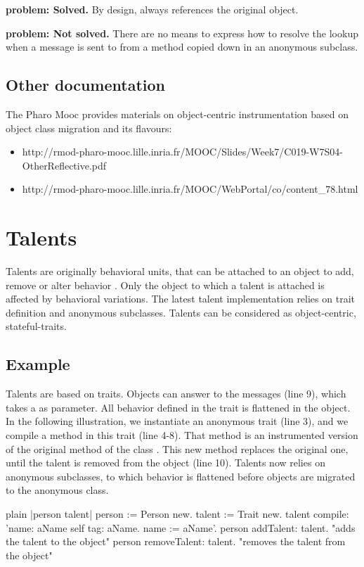 \documentclass[10pt,twoside,english]{_support/latex/sbabook/sbabook}
\begin{document}
\textbf{ problem: Solved.} By design,  always references the original object.

\textbf{ problem: Not solved.} There are no means to express how to resolve the lookup when a message is sent to  from a method copied down in an anonymous subclass.
\section{Other documentation}
The Pharo Mooc provides materials on object-centric instrumentation based on object class migration and its flavours:

\begin{itemize}
\item http://rmod-pharo-mooc.lille.inria.fr/MOOC/Slides/Week7/C019-W7S04-OtherReflective.pdf
\item http://rmod-pharo-mooc.lille.inria.fr/MOOC/WebPortal/co/content\_78.html
\end{itemize}
\chapter{Talents}
Talents are originally behavioral units, that can be attached to an object to add, remove or alter behavior \cite{ressia2014talents}. Only the object to which a talent is attached is affected by behavioral variations. The latest talent implementation relies on trait definition and anonymous subclasses. Talents can be considered as object-centric, stateful-traits.
\section{Example}
Talents are based on traits. Objects can answer to the  messages (line 9), which takes a  as parameter. All behavior defined in the trait is flattened in the object. In the following illustration, we instantiate an anonymous trait (line 3), and we compile a method in this trait (line 4-8). That method is an instrumented version of the original  method of the class . This new method replaces the original one, until the talent is removed from the object (line 10). Talents now relies on anonymous subclasses, to which behavior is flattened before objects are migrated to the anonymous class.

\begin{displaycode}{plain}
|person talent|
  person := Person new.
	talent := Trait new.
	talent
		compile:
			'name: aName
	       self tag: aName.
	       name := aName'.
	person addTalent: talent. "adds the talent to the object"
  person removeTalent: talent. "removes the talent from the object"
\end{displaycode}
\end{document}
